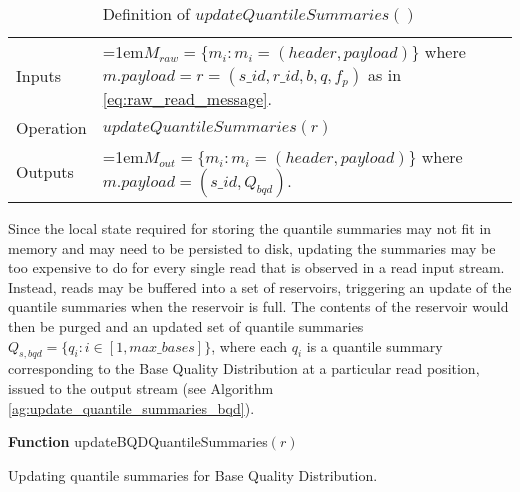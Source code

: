 \bgroup
\def\arraystretch{1.5}
\begin{table}[!ht]
    \caption{Definition of $updateQuantileSummaries()$}
    \label{tab:op_update_quantile_summaries}
    {\begin{tabular}{l|p{12cm}}
    \toprule
    Inputs & \hangindent=1em$M_{raw} = \{m_i: m_i = (header, payload)\}$ where $m.payload = r = (s\_id, r\_id, b, q, f_p)$ as in \ref{eq:raw_read_message}. \\
    \cline{2-2}
    Operation & $updateQuantileSummaries(r)$\\
    \cline{2-2}
    {Outputs} & \hangindent=1em$M_{out} = \{m_i: m_i = (header, payload)\}$ where $m.payload = (s\_id, Q_{bqd})$.\\
    \bottomrule
    \end{tabular}}
\end{table}
\egroup

Since the local state required for storing the quantile summaries may not fit in memory and may need to be persisted to disk, updating the summaries may be too expensive to do for every single read that is observed in a read input stream. Instead, reads may be buffered into a set of reservoirs, triggering an update of the quantile summaries when the reservoir is full. The contents of the reservoir would then be purged and an updated set of quantile summaries $Q_{s,{bqd}} = \{q_i: i\in [1,max\_bases]\}$, where each $q_i$ is a quantile summary corresponding to the Base Quality Distribution at a particular read position, issued to the output stream (see Algorithm \ref{ag:update_quantile_summaries_bqd}).

\begin{algorithm2e}[h]
\DontPrintSemicolon
\footnotesize
    \textbf{Function} {\sc updateBQDQuantileSummaries}$(r)$
\caption{Updating quantile summaries for Base Quality Distribution.}
\label{ag:update_quantile_summaries_bqd}
\end{algorithm2e}
\newpage
